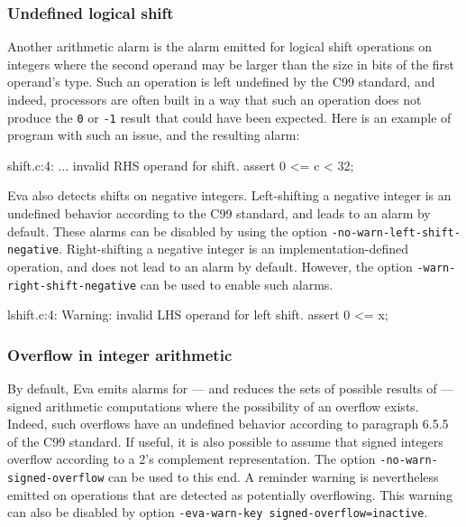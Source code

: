\documentclass[web]{frama-c-book}
\newcommand{\isoc}{\textsf{C99}}
\newcommand{\Eva}{\textsf{Eva}}
\begin{document}
\subsubsection{Undefined logical shift}
Another arithmetic alarm is the alarm emitted for logical
shift operations on integers where the second operand may be
larger than the size in bits of the first operand's type. 
Such an operation is left undefined by the \isoc{} standard, and
indeed, processors are often built in a way that such an
operation does not produce the \lstinline|0| or \lstinline|-1|
result that could have been expected. Here is an example
of program with such an issue, and the resulting alarm:
\begin{logs}
shift.c:4: ... invalid RHS operand for shift. assert 0 <= c < 32;
\end{logs}

\Eva{} also detects shifts on negative integers.
Left-shifting a negative integer is an undefined behavior according to the
\isoc{} standard, and leads to an alarm by default.
These alarms can be disabled by using the option
\lstinline|-no-warn-left-shift-negative|.
Right-shifting a negative integer is an implementation-defined operation,
and does not lead to an alarm by default.
However, the option \lstinline|-warn-right-shift-negative| can be used to
enable such alarms.

\begin{logs}
 lshift.c:4: Warning: invalid LHS operand for left shift. assert 0 <= x;
\end{logs}

\subsubsection{Overflow in integer arithmetic}

By default, \Eva{} emits alarms for --- and reduces the
sets of possible results of --- signed arithmetic computations where
the possibility of an overflow exists. Indeed,
such overflows have an undefined behavior according to
paragraph 6.5.5 of the \isoc{} standard.
%
If useful, it is also possible to assume that signed integers overflow
according to a 2's complement representation. The option
\lstinline|-no-warn-signed-overflow| can be used to this end. A
reminder warning is nevertheless emitted on operations that are detected
as potentially overflowing. This warning can also be disabled by option
\lstinline|-eva-warn-key signed-overflow=inactive|.
\end{document}
